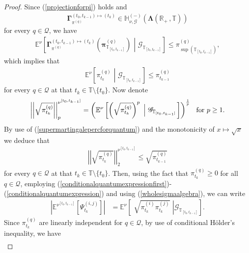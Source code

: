 \documentclass[12pt,a4paper]{article}
\def\R{\mathbb{R}}
\def\T{\mathbb{T}}
\def\G{\mathscr{G}}
\begin{document}
\begin{proof}
Since (\ref{projectionforpi}) holds and 
\begin{align}
\boldsymbol{\Gamma}_{\pi^{(q)}}^{(t_0,t_{k-1})\mapsto(t_k)} \in \mathbb{H}^{(-)}_{\nu,\G}(\boldsymbol{\Lambda}(\R_+ \,, \T))  
\end{align}
for every $q\in\mathcal{Q}$, we have
\begin{align}
\mathbb{E}^{\nu}\left[\boldsymbol{\Gamma}_{\pi^{(q)}}^{(t_0,t_{k-1})\mapsto(t_k)}\left(  \boldsymbol{\pi}_{\T_{[t_0,t_{k-1}]}}^{(q)} \right)  \,\, \left| \,\, \G_{\T_{[t_0,t_{k-1}]}} \right.\right] \leq \pi^{(q)}_{\sup(\T_{[t_0,t_{k-1}]})},\end{align}
which implies that
\begin{align}
\mathbb{E}^{\nu}\left[\pi^{(q)}_{t_{k}}  \,\, \left| \,\, \G_{\T_{[t_0,t_{k-1}]}} \right.\right] \leq \pi^{(q)}_{t_{k-1}}  \label{supermartingalepercforquantum}
\end{align}
for every $q\in\mathcal{Q}$ at that $t_k\in\T\setminus\{t_0\}$. Now denote
\begin{align}
\left|\left| \sqrt{\pi^{(q)}_{t_{k}} }\right|\right|^{\nu^{[t_{0},t_{k-1}]}}_p = \left( \mathbb{E}^{\nu}\left[\left(\sqrt{\pi^{(q)}_{t_{k}}}\right)^p \,\, \left| \,\, \G_{\T_{[t_0,t_{k-1}]}} \right.\right] \right)^{\frac{1}{p}} \hspace{0.1in} \text{for $p\geq 1$}. 
\end{align}
By use of (\ref{supermartingalepercforquantum}) and the monotonicity of $ x \mapsto \sqrt{x}$ we deduce that
\begin{align}
\left|\left| \sqrt{\pi^{(q)}_{t_{k}} }\right|\right|^{\nu^{[t_{0},t_{k-1}]}}_2 \leq \sqrt{\pi^{(q)}_{t_{k-1}}}  \label{pnormexpression}
\end{align}
for every $q\in\mathcal{Q}$ at that $t_k\in\T\setminus\{t_0\}$. Then, using the fact that $\pi_{t_{k}}^{(q)}\geq 0$ for all $q\in\mathcal{Q}$, employing (\ref{conditionalquantumexpressionfirst})-(\ref{conditionalquantumexpression}) and using (\ref{wholesigmaalgebra}), we can write
\begin{align}
\left|\mathbb{E}^{\nu^{[t_{0},t_{k-1}]}}\left[\Psi_{t_{k}}^{(i,j)}\right] \right| &= \mathbb{E}^{\nu}\left[ \,\,  \sqrt{\pi_{t_{k}}^{(i)}\pi_{t_{k}}^{(j)}} \,\, \left| \G_{\T_{[t_0,t_{k-1}]}} \right.\right]. \label{absolutedensitymatrixconditional}
\end{align}
Since $\pi_{t_{k}}^{(q)}$ are linearly independent for $q\in\mathcal{Q}$, by use of conditional H\"older's inequality, we have
\begin{align}

\end{align}
\end{proof}
\end{document}
